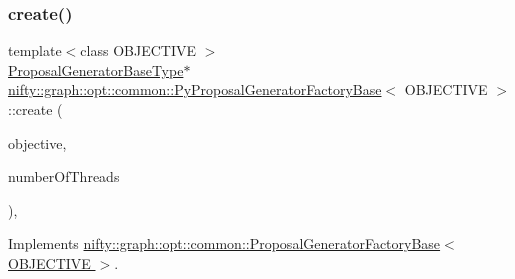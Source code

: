 \subsubsection{\texorpdfstring{create()}{create()}}
{\footnotesize\ttfamily template$<$class O\+B\+J\+E\+C\+T\+I\+VE $>$ \\
\hyperlink{classnifty_1_1graph_1_1opt_1_1common_1_1ProposalGeneratorFactoryBase_a262cfc7056a43871e15130dd4435dee7}{Proposal\+Generator\+Base\+Type}$\ast$ \hyperlink{classnifty_1_1graph_1_1opt_1_1common_1_1PyProposalGeneratorFactoryBase}{nifty\+::graph\+::opt\+::common\+::\+Py\+Proposal\+Generator\+Factory\+Base}$<$ O\+B\+J\+E\+C\+T\+I\+VE $>$\+::create (\begin{DoxyParamCaption}\item[{const \hyperlink{classnifty_1_1graph_1_1opt_1_1common_1_1ProposalGeneratorFactoryBase_abb308b47da6f89126f786b394be0efc5}{Objective\+Type} \&}]{objective,  }\item[{const size\+\_\+t}]{number\+Of\+Threads }\end{DoxyParamCaption})\hspace{0.3cm}{\ttfamily [inline]}, {\ttfamily [virtual]}}



Implements \hyperlink{classnifty_1_1graph_1_1opt_1_1common_1_1ProposalGeneratorFactoryBase_af204ed86b80c6885983dfcf822eb3b7b}{nifty\+::graph\+::opt\+::common\+::\+Proposal\+Generator\+Factory\+Base$<$ O\+B\+J\+E\+C\+T\+I\+V\+E $>$}.

\mbox{\label{classnifty_1_1graph_1_1opt_1_1common_1_1PyProposalGeneratorFactoryBase_a1e028a4615370fd13ed5eb9b3bb822a0}} 
